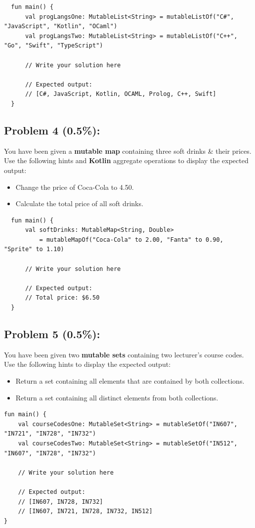 \documentclass{article}
\begin{document}
\begin{verbatim}
  fun main() {
      val progLangsOne: MutableList<String> = mutableListOf("C#", "JavaScript", "Kotlin", "OCaml")
      val progLangsTwo: MutableList<String> = mutableListOf("C++", "Go", "Swift", "TypeScript")
    
      // Write your solution here
    
      // Expected output:
      // [C#, JavaScript, Kotlin, OCAML, Prolog, C++, Swift]
  }
\end{verbatim}

\subsection*{Problem 4 (0.5\%):} You have been given a \textbf{mutable map} containing three soft drinks \& their prices. Use the following hints and \textbf{Kotlin} aggregate operations to display the expected output:
\begin{itemize}
  \item Change the price of Coca-Cola to 4.50.
  \item Calculate the total price of all soft drinks.
\end{itemize}

\begin{verbatim}
  fun main() {
      val softDrinks: MutableMap<String, Double> 
          = mutableMapOf("Coca-Cola" to 2.00, "Fanta" to 0.90, "Sprite" to 1.10)

      // Write your solution here
			
      // Expected output:
      // Total price: $6.50
  }
\end{verbatim}

\subsection*{Problem 5 (0.5\%):} You have been given two \textbf{mutable sets} containing two lecturer's course codes. Use the following hints to display the expected output:
\begin{itemize}
  \item Return a set containing all elements that are contained by both collections.
  \item Return a set containing all distinct elements from both collections.
\end{itemize}

\begin{verbatim}
fun main() {
    val courseCodesOne: MutableSet<String> = mutableSetOf("IN607", "IN721", "IN728", "IN732")
    val courseCodesTwo: MutableSet<String> = mutableSetOf("IN512", "IN607", "IN728", "IN732")
    
    // Write your solution here
    
    // Expected output:
    // [IN607, IN728, IN732]
    // [IN607, IN721, IN728, IN732, IN512] 
}
\end{verbatim}
\end{document}
